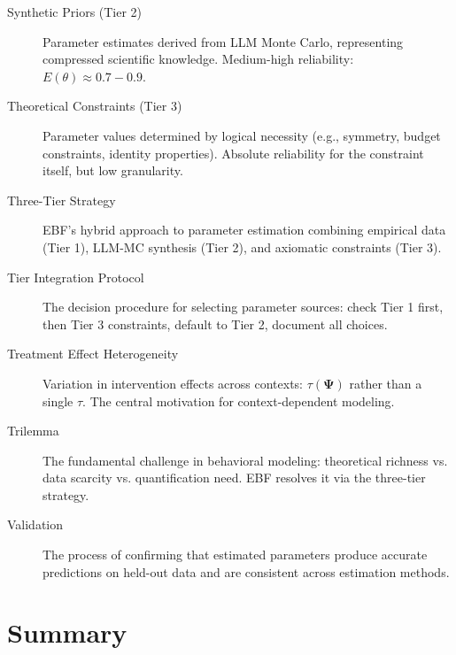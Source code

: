 \documentclass[11pt,a4paper]{article}
\theoremstyle{definition}
\begin{document}
\begin{description}
\item[Synthetic Priors (Tier 2)]
Parameter estimates derived from LLM Monte Carlo, representing compressed 
scientific knowledge. Medium-high reliability: $E(\theta) \approx 0.7-0.9$.

\item[Theoretical Constraints (Tier 3)]
Parameter values determined by logical necessity (e.g., symmetry, budget 
constraints, identity properties). Absolute reliability for the constraint 
itself, but low granularity.

\item[Three-Tier Strategy]
EBF's hybrid approach to parameter estimation combining empirical data 
(Tier 1), LLM-MC synthesis (Tier 2), and axiomatic constraints (Tier 3).

\item[Tier Integration Protocol]
The decision procedure for selecting parameter sources: check Tier 1 first, 
then Tier 3 constraints, default to Tier 2, document all choices.

\item[Treatment Effect Heterogeneity]
Variation in intervention effects across contexts: $\tau(\boldsymbol{\Psi})$ 
rather than a single $\tau$. The central motivation for context-dependent modeling.

\item[Trilemma]
The fundamental challenge in behavioral modeling: theoretical richness vs. 
data scarcity vs. quantification need. EBF resolves it via the three-tier strategy.

\item[Validation]
The process of confirming that estimated parameters produce accurate predictions 
on held-out data and are consistent across estimation methods.

\end{description}






\section{Summary}
\label{sec:bbb-summary}
\end{document}
